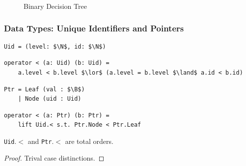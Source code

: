 \documentclass[english, aspectratio=169]{beamer}
\newcommand{\B}[0]{\ensuremath{\mathbb{B}}}
\begin{document}
\begin{frame}
{\begin{figure}
      \caption{Binary Decision Tree}
    \end{figure}
  }

\end{frame}

\begin{frame}[fragile]
  \frametitle{Data Types: Unique Identifiers and Pointers}

  \begin{lstlisting}
Uid = (level: $\N$, id: $\N$)
  \end{lstlisting}
  \begin{lstlisting}[firstnumber=2]
operator < (a: Uid) (b: Uid) =
    a.level < b.level $\lor$ (a.level = b.level $\land$ a.id < b.id)
  \end{lstlisting}

  \begin{lstlisting}[firstnumber=4]
Ptr = Leaf (val : $\B$)
    | Node (uid : Uid)
  \end{lstlisting}
  \begin{lstlisting}[firstnumber=5]
operator < (a: Ptr) (b: Ptr) =
    lift Uid.< s.t. Ptr.Node < Ptr.Leaf
  \end{lstlisting}

  \begin{lemma}
    \texttt{Uid}.$<$ and \texttt{Ptr}.$<$ are total orders.
  \end{lemma}
  \begin{proof}
    Trival case distinctions.
  \end{proof}
\end{frame}
\end{document}
